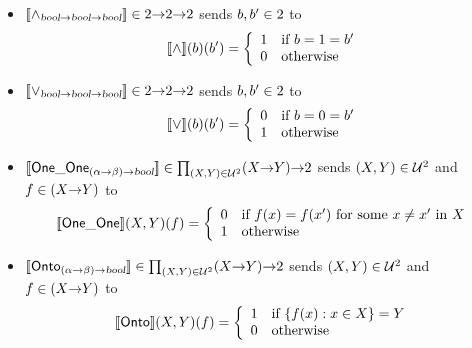 \begin{itemize}
\item $[\![\wedge_{\textsl{bool}{\to}\textsl{bool}{\to}\textsl{bool}}]\!]\in\mbox{\rm 2}{\to}\mbox{\rm 2}{\to}\mbox{\rm 2}$ sends
$b,b'\in\mbox{\rm 2}$ to
 \[ [\![\wedge]\!](b)(b') = \left\{ \begin{array}{ll}
                                   1 & \mbox{if $b=1=b'$} \\
                                    0 & \mbox{otherwise}
                                  \end{array}
                           \right. \]

\item $[\![\vee_{\textsl{bool}{\to}\textsl{bool}{\to}\textsl{bool}}]\!]\in\mbox{\rm 2}{\to}\mbox{\rm 2}{\to}\mbox{\rm 2}$ sends
$b,b'\in\mbox{\rm 2}$ to
 \[ [\![\vee]\!](b)(b') = \left\{ \begin{array}{ll}
                                 0 & \mbox{if $b=0=b'$} \\
                                 1 & \mbox{otherwise}
                                \end{array}
                        \right. \]

\item $[\![{\sf One\_One}_{(\alpha{\to}\beta){\to}\textsl{bool}}]\!]\in\prod_{(X,Y)\in{\cal
 U}^{2}} (X{\to} Y){\to} \mbox{\rm 2}$ sends $(X,Y)\in{\cal U}^{2}$ and
 $f\in(X{\to} Y)$   to
 \[ [\![{\sf One\_One}]\!](X,Y)(f) = \left\{ \begin{array}{ll}
                                     0 & \mbox{if $f(x)=f(x')$
                                               for some $x\not=x'$ in $X$} \\
                                     1 & \mbox{otherwise}
                                    \end{array}
                            \right. \]

\item $[\![{\sf Onto}_{(\alpha{\to}\beta){\to}\textsl{bool}}]\!]\in\prod_{(X,Y)\in{\cal
 U}^{2}} (X{\to} Y){\to} \mbox{\rm 2}$ sends $(X,Y)\in{\cal U}^{2}$ and
 $f\in(X{\to} Y)$   to
 \[ [\![{\sf Onto}]\!](X,Y)(f) = \left\{ \begin{array}{ll}
                                   1 & \mbox{if $\{f(x):x\in X\}=Y$} \\
                                   0 & \mbox{otherwise}
                                  \end{array}
                           \right. \]


\end{itemize}
